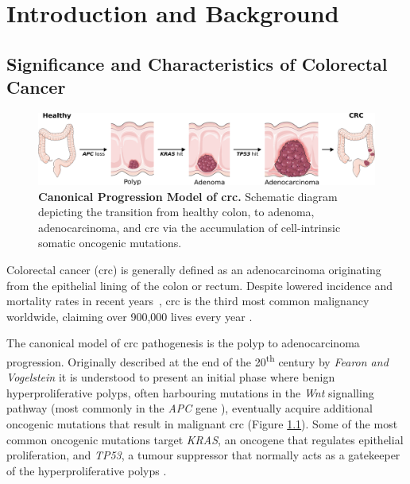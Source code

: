 \chapter{Introduction and Background}
\label{01intro}







\newpage
\section{Significance and Characteristics of Colorectal Cancer}

\begin{figure}[H] 
    \centering
    \includegraphics{01intro/figs/1BIO_CRC.png}
    \caption{\textbf{Canonical Progression Model of \acrshort{crc}.} Schematic diagram depicting the transition from healthy colon, to adenoma, adenocarcinoma, and \acrshort{crc} via the accumulation of cell-intrinsic somatic oncogenic mutations.}
    \label{fig:1crc}
\end{figure}

Colorectal cancer (\acrshort{crc}) is generally defined as an adenocarcinoma originating from the epithelial lining of the colon or rectum. Despite lowered incidence and mortality rates in recent years~\cite{cronin_annual_2022}, \acrshort{crc} is the third most common malignancy worldwide, claiming over 900,000 lives every year \cite{morgan_global_2023}.

The canonical model of \acrshort{crc} pathogenesis is the polyp to adenocarcinoma progression. Originally described at the end of the 20\textsuperscript{th} century by \emph{Fearon and Vogelstein} \cite{fearon_genetic_1990} it is understood to present an initial phase where benign hyperproliferative polyps, often harbouring mutations in the \emph{Wnt} signalling pathway (most commonly in the \emph{APC} gene \cite{aghabozorgi_role_2019}), eventually acquire additional oncogenic mutations that result in malignant \acrshort{crc} (Figure \ref{fig:1crc}). Some of the most common oncogenic mutations target \emph{KRAS}, an oncogene that regulates epithelial proliferation, and \emph{TP53}, a tumour suppressor that normally acts as a gatekeeper of the hyperproliferative polyps \cite{fearon_genetic_1990,armaghany_genetic_2012}. 

